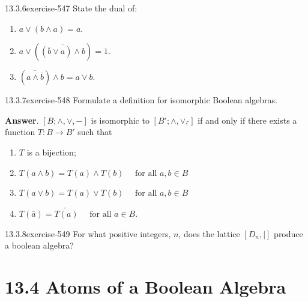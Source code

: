 \documentclass[twoside,10pt,]{book}
\numberwithin{equation}{section}
\begin{document}
\begin{divisionsolution}{13.3.6}{}{exercise-547}%
\hypertarget{p-4897}{}%
State the dual of:\leavevmode%
\begin{enumerate}[label=(\alph*)]
\item\hypertarget{li-2230}{}\hypertarget{p-4898}{}%
\(a \lor  (b \land  a) = a\).%
\item\hypertarget{li-2231}{}\hypertarget{p-4899}{}%
\(a \lor  \left(\overline{\left(\bar{b} \lor  a\right) \land  b}\right) = 1\).%
\item\hypertarget{li-2232}{}\hypertarget{p-4900}{}%
\(\left(\overline{a \land  \bar{b}}\right) \land  b = a\lor  b\).%
\end{enumerate}
%
\end{divisionsolution}%
\begin{divisionsolution}{13.3.7}{}{exercise-548}%
\hypertarget{p-4901}{}%
Formulate a definition for isomorphic Boolean algebras.%
\par\smallskip%
\noindent\textbf{Answer}.\quad%
\hypertarget{p-4902}{}%
\([B; \land, \lor, -]\) is isomorphic to \([B';\land, \lor, \tilde{}]\) if and only if there exists a  function \(T:B \to  B'\) such that\leavevmode%
\begin{enumerate}[label=(\alph*)]
\item\hypertarget{li-2233}{}\hypertarget{p-4903}{}%
\(T\) is a bijection;%
\item\hypertarget{li-2234}{}\hypertarget{p-4904}{}%
\(T(a\land b)=T(a)\land T(b)\quad \textrm{ for} \textrm{ all } a,b\in B\)%
\item\hypertarget{li-2235}{}\hypertarget{p-4905}{}%
\(T(a\lor b)=T(a)\lor T(b)\quad \textrm{ for} \textrm{ all } a, b \in B\)%
\item\hypertarget{li-2236}{}\hypertarget{p-4906}{}%
\(T(\bar{a})=\tilde{T(a)}\quad \textrm{ for all } a\in B\).%
\end{enumerate}
%
\end{divisionsolution}%
\begin{divisionsolution}{13.3.8}{}{exercise-549}%
\hypertarget{p-4907}{}%
For what positive integers, \(n\), does the lattice \([D_n,\mid]\) produce a boolean algebra?%
\end{divisionsolution}%
\section*{13.4 Atoms of a Boolean Algebra}
\end{document}
